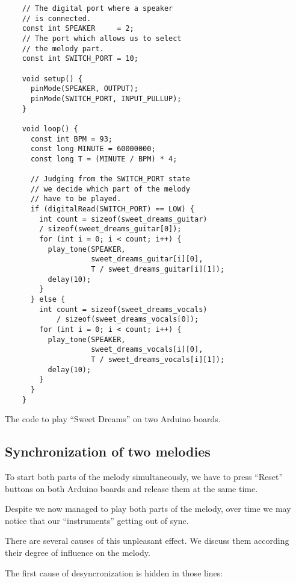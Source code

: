\documentclass[../sparc.tex]{subfiles}
\begin{document}
\begin{listing}[!h]
  \begin{verbatim}
    // The digital port where a speaker
    // is connected.
    const int SPEAKER     = 2;
    // The port which allows us to select
    // the melody part.
    const int SWITCH_PORT = 10;

    void setup() {
      pinMode(SPEAKER, OUTPUT);
      pinMode(SWITCH_PORT, INPUT_PULLUP);
    }

    void loop() {
      const int BPM = 93;
      const long MINUTE = 60000000;
      const long T = (MINUTE / BPM) * 4;

      // Judging from the SWITCH_PORT state
      // we decide which part of the melody
      // have to be played.
      if (digitalRead(SWITCH_PORT) == LOW) {
        int count = sizeof(sweet_dreams_guitar)
        / sizeof(sweet_dreams_guitar[0]);
        for (int i = 0; i < count; i++) {
          play_tone(SPEAKER,
                    sweet_dreams_guitar[i][0],
                    T / sweet_dreams_guitar[i][1]);
          delay(10);
        }
      } else {
        int count = sizeof(sweet_dreams_vocals)
            / sizeof(sweet_dreams_vocals[0]);
        for (int i = 0; i < count; i++) {
          play_tone(SPEAKER,
                    sweet_dreams_vocals[i][0],
                    T / sweet_dreams_vocals[i][1]);
          delay(10);
        }
      }
    }
  \end{verbatim}
  \caption{The code to play ``Sweet Dreams'' on two Arduino boards.}
  \label{listing:music-band-sweet-dreams-3}
\end{listing}

\newpage
\subsection{Synchronization of two melodies}

To start both parts of the melody simultaneously, we have to press ``Reset''
buttons on both Arduino boards and release them at the same time.

Despite we now managed to play both parts of the melody, over time we may notice
that our ``instruments'' getting out of sync.

There are several causes of this unpleasant effect.  We discuss them according
their degree of influence on the melody.

The first cause of desyncronization is hidden in those lines:
\end{document}
